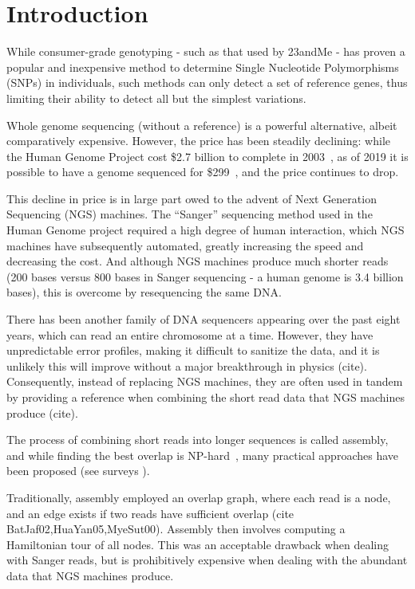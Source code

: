 \chapter{Introduction}
\label{chp:introduction}

While consumer-grade genotyping - such as that used by 23andMe - has proven a popular and inexpensive method to determine Single Nucleotide Polymorphisms (SNPs) in individuals, such methods can only detect a set of reference genes, thus limiting their ability to detect all but the simplest variations.

Whole genome sequencing (without a reference) is a powerful alternative, albeit comparatively expensive. However, the price has been steadily declining: while the Human Genome Project cost \$2.7 billion to complete in 2003~\cite{HGP}, as of 2019 it is possible to have a genome sequenced for \$299~\cite{dantelabscost}, and the price continues to drop.

This decline in price is in large part owed to the advent of Next Generation Sequencing (NGS) machines. The “Sanger” sequencing method used in the Human Genome project required a high degree of human interaction, which NGS machines have subsequently automated, greatly increasing the speed and decreasing the cost. And although NGS machines produce much shorter reads (200 bases versus 800 bases in Sanger sequencing - a human genome is 3.4 billion bases), this is overcome by resequencing the same DNA.

There has been another family of DNA sequencers appearing over the past eight years, which can read an entire chromosome at a time. However, they have unpredictable error profiles, making it difficult to sanitize the data, and it is unlikely this will improve without a major breakthrough in physics (cite). Consequently, instead of replacing NGS machines, they are often used in tandem by providing a reference when combining the short read data that NGS machines produce (cite).

The process of combining short reads into longer sequences is called assembly, and while finding the best overlap is NP-hard~\cite{Mye95}, many practical approaches have been proposed (see surveys \cite{KasMor06, MilKor10, Pop09}).

Traditionally, assembly employed an overlap graph, where each read is a node, and an edge exists if two reads have sufficient overlap (cite BatJaf02,HuaYan05,MyeSut00). Assembly then involves computing a Hamiltonian tour of all nodes. This was an acceptable drawback when dealing with Sanger reads, but is prohibitively expensive when dealing with the abundant data that NGS machines produce.

